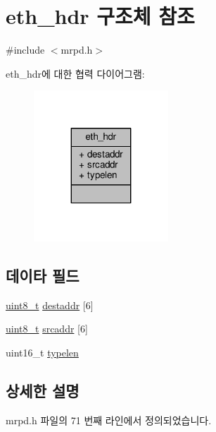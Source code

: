 \hypertarget{structeth__hdr}{}\section{eth\+\_\+hdr 구조체 참조}
\label{structeth__hdr}


{\ttfamily \#include $<$mrpd.\+h$>$}



eth\+\_\+hdr에 대한 협력 다이어그램\+:
\nopagebreak
\begin{figure}[H]
\begin{center}
\leavevmode
\includegraphics[width=143pt]{structeth__hdr__coll__graph}
\end{center}
\end{figure}
\subsection*{데이타 필드}
\begin{DoxyCompactItemize}
\item 
\hyperlink{stdint_8h_aba7bc1797add20fe3efdf37ced1182c5}{uint8\+\_\+t} \hyperlink{structeth__hdr_a28d4ce6cefd6bcaad82b0cf1fb6f189a}{destaddr} \mbox{[}6\mbox{]}
\item 
\hyperlink{stdint_8h_aba7bc1797add20fe3efdf37ced1182c5}{uint8\+\_\+t} \hyperlink{structeth__hdr_aeeb6cb7e4de7ccfa502c3e4616af41ad}{srcaddr} \mbox{[}6\mbox{]}
\item 
uint16\+\_\+t \hyperlink{structeth__hdr_a657ead984e65fc7252e805e62f083a7c}{typelen}
\end{DoxyCompactItemize}


\subsection{상세한 설명}


mrpd.\+h 파일의 71 번째 라인에서 정의되었습니다.



